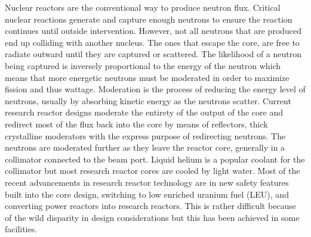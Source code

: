 Nuclear reactors are the conventional way to produce neutron flux. Critical nuclear reactions generate and capture enough neutrons to ensure the reaction continues until outside intervention. However, not all neutrons that are produced end up colliding with another nucleus. The ones that escape the core, are free to radiate outward until they are captured or scattered. The likelihood of a neutron being captured is inversely proportional to the energy of the neutron which means that more energetic neutrons must be moderated in order to maximize fission and thus wattage. Moderation is the process of reducing the energy level of neutrons, usually by absorbing kinetic energy as the neutrons scatter. Current research reactor designs moderate the entirety of the output of the core and redirect most of the flux back into the core by means of reflectors, thick crystalline moderators with the express purpose of redirecting neutrons. The neutrons are moderated further as they leave the reactor core, generally in a collimator connected to the beam port. Liquid helium is a popular coolant for the collimator but most research reactor cores are cooled by light water. Most of the recent advancements in research reactor technology are in new safety features built into the core design, switching to low enriched uranium fuel (LEU), and converting power reactors into research reactors. This is rather difficult because of the wild disparity in design considerations but this has been achieved in some facilities.\\
